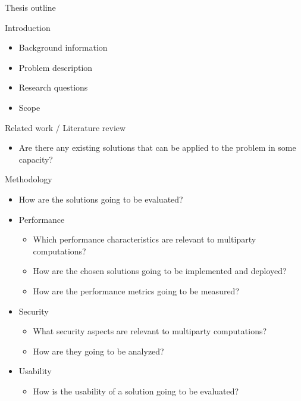 \begin{frame}{Thesis outline}
\protect\hypertarget{thesis-outline}{}
\begin{block}{Introduction}
\protect\hypertarget{introduction}{}
\begin{itemize}
\tightlist
\item
  Background information
\item
  Problem description
\item
  Research questions
\item
  Scope
\end{itemize}
\end{block}

\begin{block}{Related work / Literature review}
\protect\hypertarget{related-work-literature-review}{}
\begin{itemize}
\tightlist
\item
  Are there any existing solutions that can be applied to the problem in
  some capacity?
\end{itemize}
\end{block}

\begin{block}{Methodology}
\protect\hypertarget{methodology}{}
\begin{itemize}
\tightlist
\item
  How are the solutions going to be evaluated?
\item
  Performance

  \begin{itemize}
  \tightlist
  \item
    Which performance characteristics are relevant to multiparty
    computations?
  \item
    How are the chosen solutions going to be implemented and deployed?
  \item
    How are the performance metrics going to be measured?
  \end{itemize}
\item
  Security

  \begin{itemize}
  \tightlist
  \item
    What security aspects are relevant to multiparty computations?
  \item
    How are they going to be analyzed?
  \end{itemize}
\item
  Usability

  \begin{itemize}
  \tightlist
  \item
    How is the usability of a solution going to be evaluated?
  \end{itemize}
\end{itemize}
\end{block}


\end{frame}
